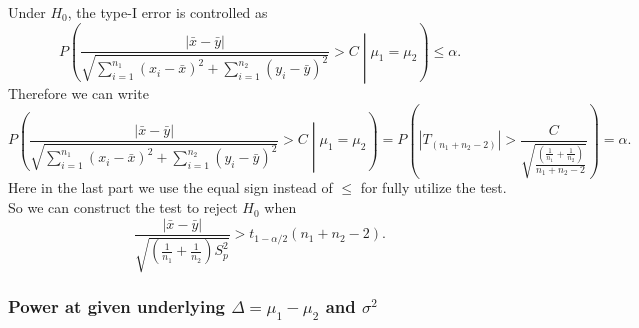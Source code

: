\documentclass[a4paper,12pt]{article}
\begin{document}
Under $H_0$, the type-I error is controlled as
\[
  P\left(
    \frac{\left|\bar{x} - \bar{y}\right|}{
      \sqrt{
        \sum\limits_{i = 1}^{n_1}\left(x_i - \bar{x}\right)^2
        + \sum\limits_{i = 1}^{n_2}\left(y_i - \bar{y}\right)^2 
      }
    }
    > C
    \middle| \mu_1 = \mu_2
  \right)
  \leq \alpha
  .
\]
Therefore we can write
\[
  P\left(
    \frac{\left|\bar{x} - \bar{y}\right|}{
      \sqrt{
        \sum\limits_{i = 1}^{n_1}\left(x_i - \bar{x}\right)^2
        + \sum\limits_{i = 1}^{n_2}\left(y_i - \bar{y}\right)^2 
      }
    }
    > C
    \middle| \mu_1 = \mu_2
  \right)
  = P\left(
    \left|T_{\left(n_1 + n_2 - 2\right)}\right|
    > \frac{C}{
      \sqrt{\frac{
          \left(\frac{1}{n_1} + \frac{1}{n_2}\right)  
        }{
          n_1 + n_2 - 2
        }
      }
    }
  \right)
  = \alpha
  .
\]
Here in the last part we use the equal sign instead of $\leq$ for fully utilize the test. So we can construct the test to reject $H_0$ when
\[
  \frac{
    \left|\bar{x} - \bar{y}\right|
  }{
    \sqrt{
      \left(\frac{1}{n_1} + \frac{1}{n_2}\right)
      S_p^2
    }
  }
  > t_{1 - \alpha / 2}\left(n_1 + n_2 - 2\right)
  .
\]

\subsubsection{Power at given underlying $\Delta = \mu_1 - \mu_2$ and $\sigma^2$}
\label{sec:power-at-given-3}
\end{document}
